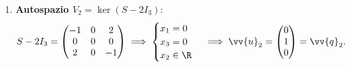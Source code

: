 \begin{dimostrazione}
\begin{enumerate}
    \item \textbf{Autospazio $V_2 = \ker(S - 2I_3)$}:
    \begin{equation}
        S - 2I_3 = \begin{pmatrix} -1 & 0 & 2 \\ 0 & 0 & 0 \\ 2 & 0 & -1 \end{pmatrix} \implies \begin{cases} x_1 = 0 \\ x_3 = 0 \\ x_2 \in \R \end{cases} \implies \vv{u}_2 = \begin{pmatrix} 0 \\ 1 \\ 0 \end{pmatrix} = \vv{q}_2.
    \end{equation}


\end{enumerate}
\end{dimostrazione}
